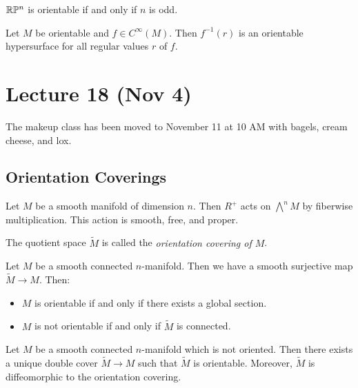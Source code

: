 \documentclass[twoside, 10pt]{article}
\begin{document}
    \begin{exer}[Homework] $\mathbb{R}\mathbb{P}^n$ is orientable if and only if $n$ is odd.
    \end{exer}

    \begin{exm} Let $M$ be orientable and $f \in C^{\infty}(M)$. Then
    $f^{-1}(r)$ is an orientable hypersurface for all regular values $r$ of
$f$.  \end{exm}

    \section{Lecture 18 (Nov 4)}%
    
    The makeup class has been moved to November 11 at 10 AM with bagels, cream
    cheese, and lox.

    \subsection{Orientation Coverings}%
    
    \begin{lem} Let $M$ be a smooth manifold of dimension $n$. Then $R^{+}$
    acts on $\bigwedge^n M$ by fiberwise multiplication. This action is smooth,
free, and proper.  \end{lem}

    \begin{defn} The quotient space $\widetilde{M}$ is called the
    \textit{orientation covering of $M$}.  \end{defn}

    \begin{thm} Let $M$ be a smooth connected $n$-manifold. Then we have a
        smooth surjective map $\widetilde{M} \to M$. Then: \begin{itemize}
            \item $M$ is orientable if and only if there exists a global
                section.  \item $M$ is not orientable if and only if
                $\widetilde{M}$ is connected.  \end{itemize} \end{thm}

    \begin{thm} Let $M$ be a smooth connected $n$-manifold which is not
        oriented. Then there exists a unique double cover $\widetilde{M} \to M$
        such that $\widetilde{M}$ is orientable. Moreover, $\widetilde{M}$ is
        diffeomorphic to the orientation covering.  \end{thm}
\end{document}
